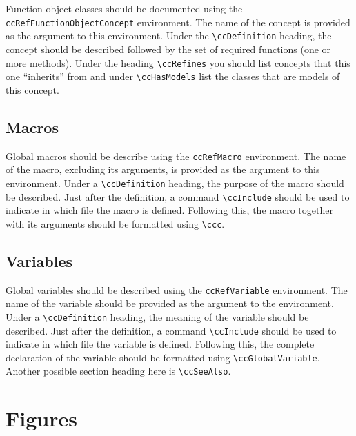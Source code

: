 Function object classes should be documented using the
{\tt ccRefFunctionObjectConcept} environment.
The name of the concept is provided as the argument to this environment.
Under the \verb|\ccDefinition| heading, the concept should be described
followed by the set of required functions (one or more
 methods).  Under the heading \verb|\ccRefines| 
you should list concepts that this one ``inherits'' from and
under \verb|\ccHasModels| list the classes that are models of this
concept.

\subsection{Macros}
\label{sec:ref_macro}

Global macros should be describe using the {\tt ccRefMacro} environment.
The name of the macro, excluding its arguments, is provided as the argument
to this environment.  Under a \verb|\ccDefinition| heading, the purpose of
the macro should be described.  Just after the definition, a command 
\verb|\ccInclude| should be used to indicate in which file the macro is 
defined.  Following this, the macro together with its arguments should 
be formatted using \verb|\ccc|.  

\subsection{Variables}
\label{sec:ref_variable}

Global variables should be described using the 
{\tt ccRefVariable} environment.
The name of the variable
should be provided as the argument to the environment.  Under a
\verb|\ccDefinition| heading, the meaning of the variable
should be described.  Just after the definition, a command 
\verb|\ccInclude| should be used to indicate in which file the variable
is defined.  Following this, the complete declaration of the variable
should be formatted using \verb|\ccGlobalVariable|.
Another possible section heading here is \verb|\ccSeeAlso|.


\section{Figures}
\label{sec:doc_figures}

